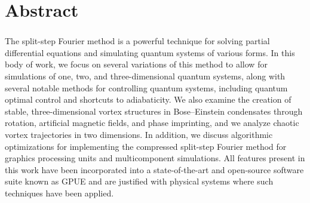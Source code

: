 \chapter*{Abstract} 
\subsection*{\thesistitle}

The split-step Fourier method is a powerful technique for solving partial differential equations and simulating quantum systems of various forms. In this body of work, we focus on several variations of this method to allow for simulations of one, two, and three-dimensional quantum systems, along with several notable methods for controlling quantum systems, including quantum optimal control and shortcuts to adiabaticity. We also examine the creation of stable, three-dimensional vortex structures in Bose--Einstein condensates through rotation, artificial magnetic fields, and phase imprinting, and we analyze chaotic vortex trajectories in two dimensions. In addition, we discuss algorithmic optimizations for implementing the compressed split-step Fourier method for graphics processing units and multicomponent simulations. All features present in this work have been incorporated into a state-of-the-art and open-source software suite known as GPUE and are justified with physical systems where such techniques have been applied.
